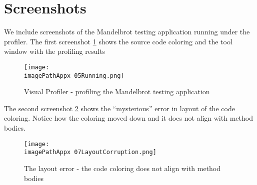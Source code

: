 \section{Screenshots}
We include screenshots of the Mandelbrot testing application running under the profiler. The first screenshot \ref{fig:0905Running} shows the source code coloring and the tool window with the profiling results

\begin{figure}[H]
	\centering
		\texttt{[image: \\imagePathAppx 05Running.png]}
		\caption{Visual Profiler - profiling the Mandelbrot testing application}
	\label{fig:0905Running}
\end{figure}

The second screenshot \ref{fig:0907LayoutCorruption} shows the ``mysterious'' error in layout of the code coloring. Notice how the coloring moved down and it does not align with method bodies. 

\begin{figure}[H]
	\centering
		\texttt{[image: \\imagePathAppx 07LayoutCorruption.png]}
		\caption{The layout error - the code coloring does not align with method bodies }
	\label{fig:0907LayoutCorruption}
\end{figure}


